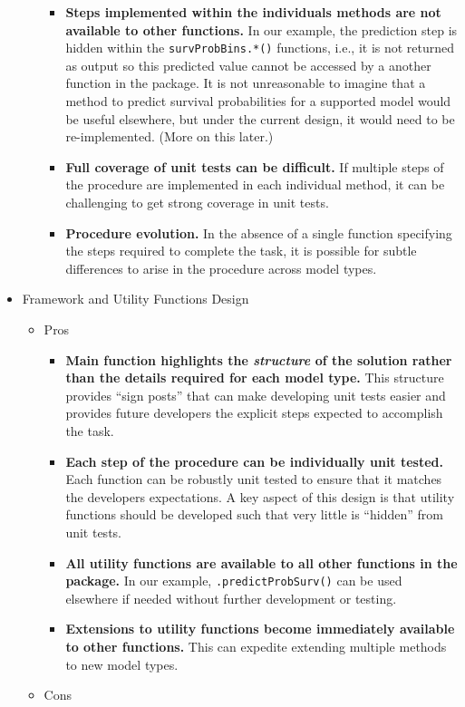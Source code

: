 \documentclass[
]{book}
\providecommand{\tightlist}{%
  \setlength{\itemsep}{0pt}\setlength{\parskip}{0pt}}
\begin{document}
\begin{itemize}
\begin{itemize}
    \begin{itemize}
    \tightlist
    \item
      \textbf{Steps implemented within the individuals methods are not available to other functions.}
      In our example, the prediction step is hidden within the \texttt{survProbBins.*()} functions, i.e., it is not returned as output so this predicted value cannot be accessed by a another function in the package. It is not unreasonable to imagine that a method to predict survival probabilities for a supported model would be useful elsewhere, but under the current design, it would need to be re-implemented. (More on this later.)
    \item
      \textbf{Full coverage of unit tests can be difficult.}
      If multiple steps of the procedure are implemented in each individual method, it can be challenging to get strong coverage in unit tests.
    \item
      \textbf{Procedure evolution.}
      In the absence of a single function specifying the steps required to complete the task, it is possible for subtle differences to arise in the procedure across model types.
    \end{itemize}
  \end{itemize}
\item
  Framework and Utility Functions Design

  \begin{itemize}
  \tightlist
  \item
    Pros

    \begin{itemize}
    \tightlist
    \item
      \textbf{Main function highlights the \emph{structure} of the solution rather than the details required for each model type.}
      This structure provides ``sign posts'' that can make developing unit tests easier and provides future developers the explicit steps expected to accomplish the task.
    \item
      \textbf{Each step of the procedure can be individually unit tested.}
      Each function can be robustly unit tested to ensure that it matches the developers expectations. A key aspect of this design is that utility functions should be developed such that very little is ``hidden'' from unit tests.
    \item
      \textbf{All utility functions are available to all other functions in the package.}
      In our example, \texttt{.predictProbSurv()} can be used elsewhere if needed without further development or testing.
    \item
      \textbf{Extensions to utility functions become immediately available to other functions.}
      This can expedite extending multiple methods to new model types.
    \end{itemize}
  \item
    Cons


\end{itemize}
\end{itemize}
\end{document}
